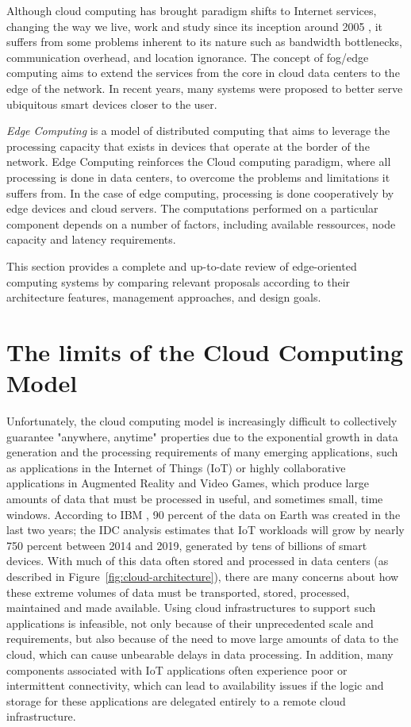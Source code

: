 
Although cloud computing has brought paradigm shifts to Internet services,
changing the way we live, work and study since its inception around 2005
\cite{armbrust2010view},
it suffers from some problems inherent to its nature
such as bandwidth bottlenecks,
communication overhead,
and location ignorance.
The concept of fog/edge computing aims to extend the services
from the core in cloud data centers to the edge of the network.
In recent years,
many systems were proposed to better serve ubiquitous smart devices closer
to the user.

\textit{Edge Computing} \cite{shi2016edge} is a model of distributed computing 
that aims to  leverage the processing capacity that exists in devices that 
operate at the border of the network. 
Edge Computing reinforces the Cloud computing paradigm,
where all processing is done in data centers,
to overcome the problems and limitations it suffers from.
In the case of edge computing, processing is done cooperatively by edge devices
and cloud servers.
The computations performed on a particular component depends on a number of 
factors, including available ressources, node capacity and latency requirements.

This section provides a complete and up-to-date review of edge-oriented
computing systems by comparing relevant proposals according to their architecture
features,
management approaches,
and design goals.

\section{The limits of the Cloud Computing Model}
\label{sec:ec:cloud-computing-limits}
Unfortunately, the cloud computing model is increasingly difficult to collectively guarantee "anywhere, anytime" properties due to the exponential growth in data generation and the processing requirements of many emerging applications, such as applications in the Internet of Things (IoT) or highly collaborative applications in Augmented Reality and Video Games, which produce large amounts of data that must be processed in useful, and sometimes small, time windows.
According to IBM \cite{IBM2016BigData:online}, 90 percent of the data on Earth was created in the last two years; the IDC analysis \cite{Datacent69:online} estimates that IoT workloads will grow by nearly 750 percent between 2014 and 2019, generated by tens of billions of smart devices. With much of this data often stored and processed in data centers (as described in Figure~\ref{fig:cloud-architecture}), there are many concerns about how these extreme volumes of data must be transported, stored, processed, maintained and made available. 
Using cloud infrastructures to support such applications is infeasible, not only because of their unprecedented scale and requirements, but also because of the need to move large amounts of data to the cloud, which can cause unbearable delays in data processing. In addition, many components associated with IoT applications often experience poor or intermittent connectivity, which can lead to availability issues if the logic and storage for these applications are delegated entirely to a remote cloud infrastructure.

